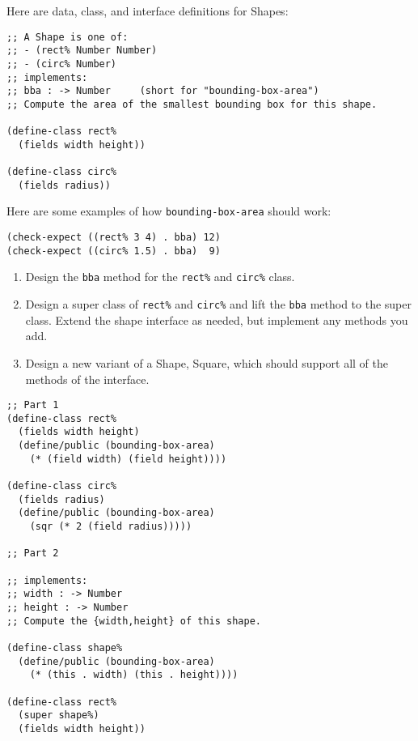 \documentclass[12pt]{article}                   %
\def\pts#1{\marginpar{\footnotesize \raggedright  \fbox{#1 {\sc Points}}}}
\newenvironment{solution}{}{}
\newcommand\code[1]{\texttt{#1}}
\begin{document}
\begin{problem}\pts{??}

Here are data, class, and interface definitions for Shapes:
\begin{verbatim}
;; A Shape is one of:
;; - (rect% Number Number)
;; - (circ% Number)
;; implements:
;; bba : -> Number     (short for "bounding-box-area")
;; Compute the area of the smallest bounding box for this shape.

(define-class rect%
  (fields width height))

(define-class circ%
  (fields radius))
\end{verbatim}
%
Here are some examples of how \code{bounding-box-area} should work:
\begin{verbatim}
(check-expect ((rect% 3 4) . bba) 12)
(check-expect ((circ% 1.5) . bba)  9)
\end{verbatim}


\begin{enumerate}
\item Design the \code{bba} method for the
  \code{rect\%} and \code{circ\%} class.

\item Design a super class of \code{rect\%} and \code{circ\%} and
  lift the \code{bba} method to the super class.  Extend
  the shape interface as needed, but implement any methods you add.

\item Design a new variant of a Shape, Square, which should support
  all of the methods of the interface.
\end{enumerate}

\begin{solution}
\begin{verbatim}
;; Part 1
(define-class rect% 
  (fields width height)
  (define/public (bounding-box-area)
    (* (field width) (field height))))
  
(define-class circ% 
  (fields radius)
  (define/public (bounding-box-area)
    (sqr (* 2 (field radius)))))

;; Part 2

;; implements:
;; width : -> Number
;; height : -> Number
;; Compute the {width,height} of this shape.

(define-class shape% 
  (define/public (bounding-box-area)
    (* (this . width) (this . height))))

(define-class rect% 
  (super shape%)
  (fields width height))
  

\end{verbatim}
\end{solution}
\end{problem}
\end{document}
